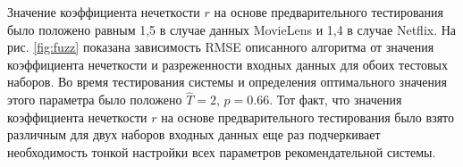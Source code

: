 \documentclass[a4paper, 12pt]{article} %
\begin{document}
	\par	
	Значение коэффициента нечеткости $r$ на основе предварительного тестирования было положено равным 1,5 в случае данных MovieLens и 1,4 в случае Netflix. На рис. \ref{fig:fuzz} показана зависимость RMSE описанного алгоритма от значения коэффициента нечеткости и разреженности входных данных для обоих тестовых наборов. Во время тестирования системы и определения оптимального значения этого параметра было положено $\hat{T}=2$, $p=0.66$. Тот факт, что значения коэффициента нечеткости $r$ на основе предварительного тестирования было взято различным для двух наборов входных данных еще раз подчеркивает необходимость тонкой настройки всех параметров рекомендательной системы.
	
	\begin{figure}[h]
	\begin{minipage}[h]{0.49\linewidth}
	\end{minipage}
	\hfill
	\begin{minipage}[h]{0.49\linewidth}

\end{minipage}
\end{figure}
\end{document}
